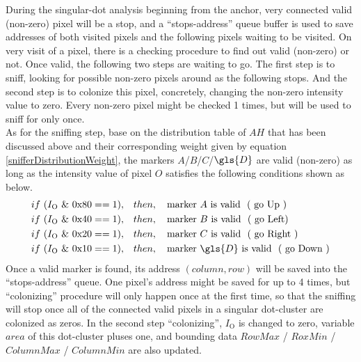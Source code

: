 %
During the singular-dot analysis beginning from the anchor, very connected valid (non-zero) pixel will be a stop, and a \enquote{stops-address} queue buffer is used to save addresses of both visited pixels and the following pixels waiting to be visited. On very visit of a pixel, there is a checking procedure to find out valid (non-zero) or not. Once valid, the following two steps are waiting to go. The first step is to sniff, looking for possible non-zero pixels around as the following stops. And the second step is to colonize this pixel, concretely, changing the non-zero intensity value to zero. Every non-zero pixel might be checked 1 times, but will be used to sniff for only once.%
\\\indent%
As for the sniffing step, base on the distribution table of \(A\)\texttildelow \(H\) that has been discussed above and their corresponding weight given by equation \ref{snifferDistributionWeight}, the markers \(A\)/\(B\)/\(C\)/\(\gls{D}\) are valid (non-zero) as long as the intensity value of pixel \(O\) satisfies the following conditions shown as below.%
%
\begin{equation*}
%
\begin{aligned}
if \,\, ( I_{\text{O}} \,\, \& \,\, \text{0x80}  == 1 ),\quad &then, \quad \text{marker } A\,\, \text{is valid \,\,( go Up )}%
\\%
if \,\, ( I_{\text{O}} \,\, \& \,\, \text{0x40}  == 1 ),\quad &then, \quad \text{marker } B\,\, \text{is valid \,\,( go  Left)}%
\\%
if \,\, ( I_{\text{O}} \,\, \& \,\, \text{0x20}  == 1 ),\quad &then, \quad \text{marker } C\,\,\text{is valid \,\,( go Right )}%
\\%
if \,\, ( I_{\text{O}} \,\, \& \,\, \text{0x10}  == 1 ),\quad &then,\quad \text{marker } \gls{D}\,\,\text{is valid \,\,( go Down )}%
\\%
\end{aligned}
%
\end{equation*}%
%
\noindent
Once a valid marker is found, its address \((column, row)\) will be saved into the \enquote{stops-address} queue. One pixel's address might be saved for up to 4 times, but \enquote{colonizing} procedure will only happen once at the first time, so that the sniffing will stop once all of the connected valid pixels in a singular dot-cluster are colonized as zeros.%
%
In the second step \enquote{colonizing},  \(I_{\text{O}}\) is changed to zero, variable \(area\) of this dot-cluster pluses one, and bounding data \(RowMax\) / \(RoxMin\) / \(ColumnMax\) / \(ColumnMin\) are also updated.%
